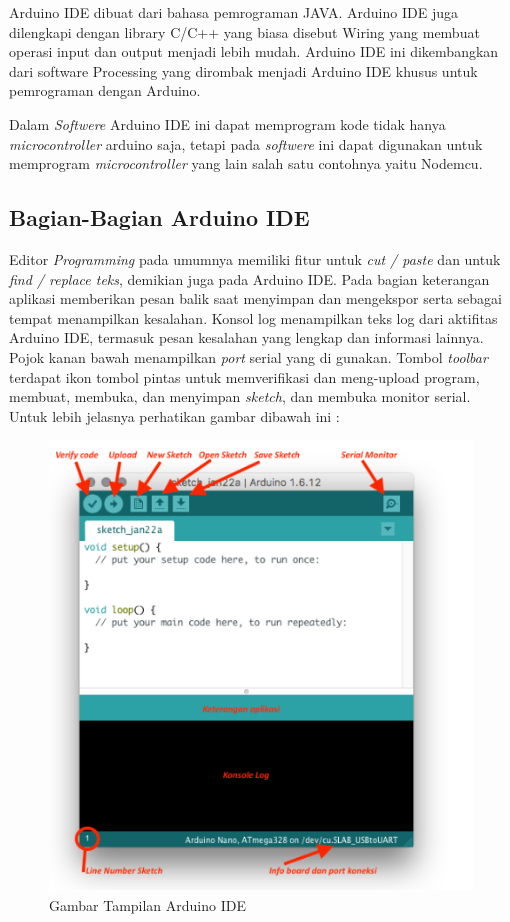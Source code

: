 Arduino IDE dibuat dari bahasa pemrograman JAVA. Arduino IDE juga dilengkapi dengan library C/C++ yang biasa disebut Wiring yang membuat operasi input dan output menjadi lebih mudah. Arduino IDE ini dikembangkan dari software Processing yang dirombak menjadi Arduino IDE khusus untuk pemrograman dengan Arduino.

Dalam \textit{Softwere} Arduino IDE ini dapat memprogram kode tidak hanya \textit{microcontroller} arduino saja, tetapi pada \textit{softwere} ini dapat digunakan untuk memprogram \textit{microcontroller} yang lain salah satu contohnya yaitu Nodemcu.

\subsection{Bagian-Bagian Arduino IDE}
Editor \textit{Programming} pada umumnya memiliki fitur untuk \textit{cut / paste} dan untuk \textit{find / replace teks}, demikian juga pada Arduino IDE. Pada bagian keterangan aplikasi memberikan pesan balik saat menyimpan dan mengekspor serta sebagai tempat menampilkan kesalahan. Konsol log menampilkan teks log dari aktifitas Arduino IDE, termasuk pesan kesalahan yang lengkap dan informasi lainnya. Pojok kanan bawah menampilkan \textit{port} serial yang di gunakan. Tombol \textit{toolbar} terdapat ikon tombol pintas untuk memverifikasi dan meng-upload program, membuat, membuka, dan menyimpan \textit{sketch}, dan membuka monitor serial. Untuk lebih jelasnya perhatikan gambar dibawah ini :

\begin{figure}[H]
\centering
\includegraphics[width=1\textwidth]{figures/arduino.png}
\caption{Gambar Tampilan Arduino IDE}
\label{print}
\end{figure}

